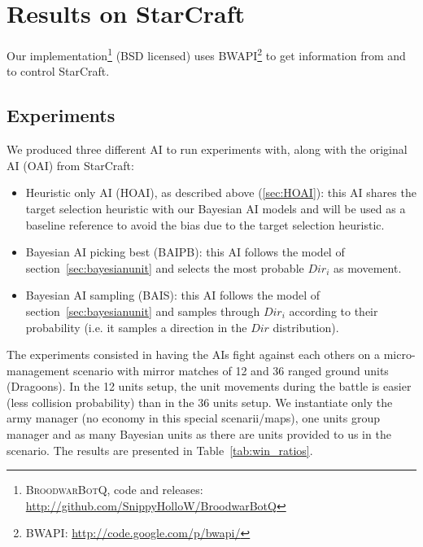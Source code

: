 \section{Results on StarCraft}

Our implementation\footnote{\textsc{BroodwarBotQ}, code and releases: \url{http://github.com/SnippyHolloW/BroodwarBotQ}} (BSD licensed) uses BWAPI\footnote{BWAPI: \url{http://code.google.com/p/bwapi/}} to get information from and to control StarCraft. 

\subsection{Experiments}

We produced three different AI to run experiments with, along with the original AI (OAI) from StarCraft:
\begin{itemize}
\item Heuristic only AI (HOAI), as described above (\ref{sec:HOAI}): this AI shares the target selection heuristic with our Bayesian AI models and will be used as a baseline reference to avoid the bias due to the target selection heuristic.
\item Bayesian AI picking best (BAIPB): this AI follows the model of section~\ref{sec:bayesianunit} and selects the most probable $Dir_i$ as movement. 
\item Bayesian AI sampling (BAIS): this AI follows the model of section~\ref{sec:bayesianunit} and samples through $Dir_i$ according to their probability (i.e. it samples a direction in the $Dir$ distribution).
\end{itemize}

The experiments consisted in having the AIs fight against each others on a micro-management scenario with mirror matches of 12 and 36 ranged ground units (Dragoons). In the 12 units setup, the unit movements during the battle is easier (less collision probability) than in the 36 units setup. We instantiate only the army manager (no economy in this special scenarii/maps), one units group manager and as many Bayesian units as there are units provided to us in the scenario. The results are presented in Table~\ref{tab:win_ratios}.

